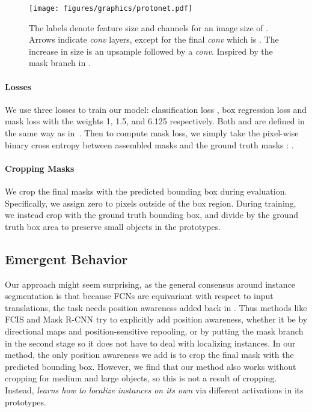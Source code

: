 \documentclass[10pt,journal,compsoc]{IEEEtran}
\begin{document}
    \begin{figure}
    \centering
    
\texttt{[image: figures/graphics/protonet.pdf]}


    \caption{ The labels denote feature size and channels for an image size of . Arrows indicate  \textit{conv} layers, except for the final \textit{conv} which is . The increase in size is an upsample followed by a \textit{conv}. Inspired by the mask branch in \cite{maskrcnn}. }
\label{fig:protonet}
\end{figure} 

\paragraph{Losses} We use three losses to train our model: classification loss , box regression loss  and mask loss  with the weights 1, 1.5, and 6.125 respectively. Both  and  are defined in the same way as in~\cite{ssd}. Then to compute mask loss, we simply take the pixel-wise binary cross entropy between assembled masks  and the ground truth masks : .

\paragraph{Cropping Masks}
\label{sec:crop_mask}
We crop the final masks with the predicted bounding box during evaluation.  Specifically, we assign zero to pixels outside of the box region.  During training, we instead crop with the ground truth bounding box, and divide  by the ground truth box area to preserve small objects in the prototypes.

    
\subsection{Emergent Behavior}
Our approach might seem surprising, as the general consensus around instance segmentation is that because FCNs are equivariant with respect to input translations, the task needs position awareness added back in \cite{fcis}. Thus methods like FCIS \cite{fcis} and Mask R-CNN \cite{maskrcnn} try to explicitly add position awareness, whether it be by directional maps and position-sensitive repooling, or by putting the mask branch in the second stage so it does not have to deal with localizing instances. In our method, the only position awareness we add is to crop the final mask with the predicted bounding box. However, we find that our method also works without cropping for medium and large objects, so this is not a result of cropping. Instead, \methodname{} \textit{learns how to localize instances on its own} via different activations in its prototypes.
\end{document}
